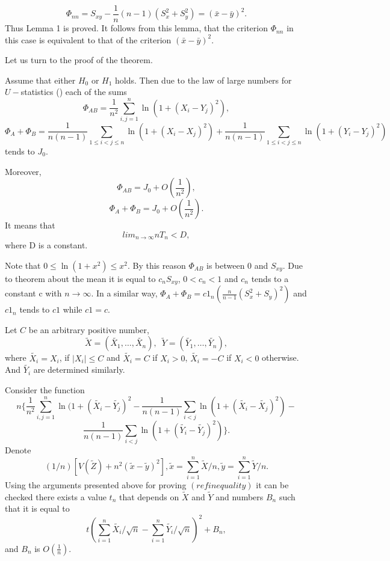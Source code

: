 \documentclass{svproc}
\begin{document}
$$
\Phi_{nn}= S_{xy} - \frac{1}{n}(n-1)(S_x^2+S_y^2)=(\bar x - \bar y)^2.  
$$
Thus Lemma 1 is proved.
It follows from this lemma, that the criterion $\Phi_{nn}$ in this case is equivalent to that of the criterion $(\bar x - \bar y)^2.$

Let us turn to the proof of the theorem.

Assume that either $H_0$ or $H_1$ holds. Then due to the law of large numbers for $U-$statistics (\cite{Hoeffding}) each of the sums 
$$
\Phi_{AB}=\frac{1}{n^2}\sum_{i,j=1}^n \ln(1 + (X_i - Y_j)^2),
$$
$$
\Phi_{A}+ \Phi_{B}=\frac{1}{n(n-1)}\sum_{1\leq i<j\leq n}  \ln(1 + (X_i - X_j)^2)+
\frac{1}{n(n-1)}\sum_{1\leq i<j\leq n}  \ln(1 + (Y_i - Y_j)^2)
$$
tends to $J_0$. 

Moreover,
$$
\Phi_{AB}= J_0 +  O(\frac{1}{n^2}),
$$
$$
\Phi_{A}+ \Phi_{B}=J_0 +  O(\frac{1}{n^2}).
$$
It means that
\begin{equation}\label{inequality}
lim_{n \to \infty} nT_n <D,
\end{equation}
where D is a constant.

 Note that  $0 \leq \ln (1+x^2) \leq x^2$.  By this reason
$\Phi_{AB}$ is between 0 and $S_{xy}$. Due to theorem about the mean it is equal to $c_nS_{xy}$, $0<c_n<1$ and $c_n$ tends to a constant c with $n \to \infty$. In a similar way, 
$\Phi_{A}+ \Phi_{B}= c1_n(\frac{n}{n-1}(S_x^2+S_y)^2)$
and $c1_n$ tends to $c1$ while $c1=c$.

Let  $C$ be an arbitrary positive number,
$$
\tilde{X}=(\tilde{X_{1}},\ldots,\tilde{X_{n}}),\,\,\,
\tilde{Y}=(\tilde{Y_{1}},\ldots, \tilde{Y_{n}}),
$$
where $\tilde{X_{i}}=X_{i}$, if $
|X_{i}| \leq C$ and
 $\tilde{X_i}=C$ if $X_{i}>0$,
  $\tilde{X_i}=-C$ if $X_{i}<0$ otherwise. And $\tilde{Y_{i}}$ are determined similarly. 
  

 
 Consider the function
\begin{equation}\label{T_n1}
n\{\frac{1}{n^2}\sum_{i,j=1}^n \ln(1 + (\tilde{X_{i}} - \tilde{Y_j})^2 -\frac{1}{n(n-1)}\sum_{i<j} \ln(1 + (\tilde{X_i} - \tilde{X_j})^2) -
\end{equation}
\begin{equation}\label{T_n2}
 \frac{1}{n(n-1)}\sum_{i<j}  \ln(1 + (\tilde{Y_i} - \tilde{Y_j})^2)\}.
\end{equation} 
Denote
$$
(1/n)[V(\tilde Z)+n^2(\tilde x-\tilde y)^2],\tilde x =\sum_{i=1}^n \tilde X/n,\tilde y =\sum_{i=1}^n \tilde Y/n.
$$
Using the arguments presented above for proving $(ref{inequality})$ it can be checked there exists a value $t_n$ that depends on $\tilde{X}$ and $\tilde{Y}$ and numbers  $B_n$  such that it is equal to
\begin{equation}\label{T_n3} 
  t(\sum_{i=1}^n \tilde{X_{i}}/\sqrt{n}-\sum_{i=1}^n \tilde{Y_{i}}/\sqrt{n})^2 + B_n,
\end{equation}
and $B_n$ is $O(\frac{1}{n})$.
\end{document}
